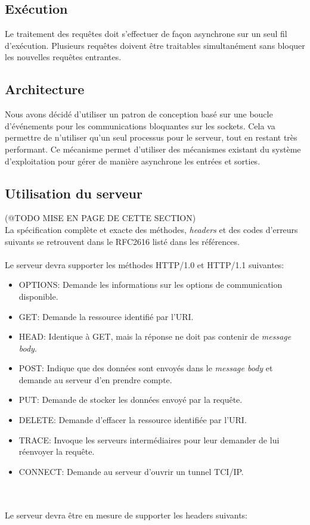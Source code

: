 \documentclass{scrreprt}
\begin{document}
\subsection{Exécution}
Le traitement des requêtes doit s'effectuer de façon asynchrone sur un seul fil
d'exécution. Plusieurs requêtes doivent être traitables simultanément sans bloquer
les nouvelles requêtes entrantes.
\subsection{Architecture}
Nous avons décidé d'utiliser un patron de conception basé sur
une boucle d’événements pour les communications bloquantes sur les sockets. Cela va 
permettre de n'utiliser qu'un seul processus pour le serveur, tout en restant très performant.
Ce mécanisme permet d'utiliser des mécanismes existant du système d'exploitation
pour gérer de manière asynchrone les entrées et sorties\cite{c10k}.



\subsection{Utilisation du serveur}
(@TODO MISE EN PAGE DE CETTE SECTION)\\
La spécification complète et exacte des méthodes, \textit{headers} et des codes d'erreurs suivants se retrouvent dans le RFC2616 listé dans les références.\\\\
Le serveur devra supporter les méthodes HTTP/1.0 et HTTP/1.1 suivantes:\\
\begin{itemize}
 \item OPTIONS: Demande les informations sur les options de communication disponible.
 \item GET: Demande la ressource identifié par l'URI.
 \item HEAD: Identique à GET, mais la réponse ne doit pas contenir de \textit{message body}.
 \item POST: Indique que des données sont envoyés dans le \textit{message body} et demande au serveur d'en prendre compte.
 \item PUT: Demande de stocker les données envoyé par la requête.
 \item DELETE: Demande d'effacer la ressource identifiée par l'URI.
 \item TRACE: Invoque les serveurs intermédiaires pour leur demander de lui réenvoyer la requête.
 \item CONNECT: Demande au serveur d'ouvrir un tunnel TCI/IP.
 \\
\end{itemize}
\\\\
Le serveur devra être en mesure de supporter les headers suivants: \\
\end{document}
